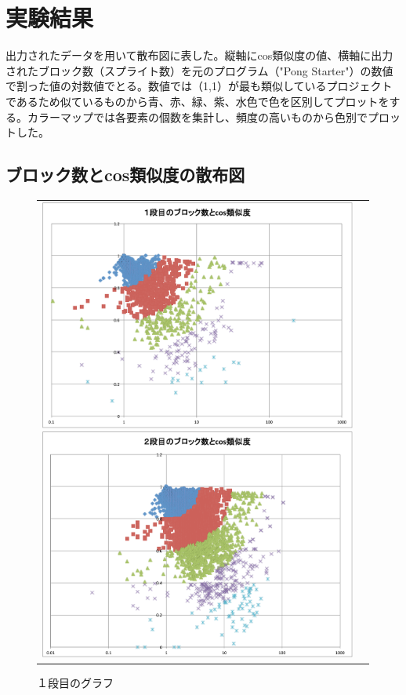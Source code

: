 \documentclass[twocolumn,9pt,a4paper]{jsarticle}
\begin{document}
\section{実験結果}
出力されたデータを用いて散布図に表した。縦軸にcos類似度の値、横軸に出力されたブロック数（スプライト数）を元のプログラム（"Pong Starter"）の数値で割った値の対数値でとる。数値では（1,1）が最も類似しているプロジェクトであるため似ているものから青、赤、緑、紫、水色で色を区別してプロットをする。カラーマップでは各要素の個数を集計し、頻度の高いものから色別でプロットした。
\\
\subsection{ブロック数とcos類似度の散布図}
\begin{figure}[h]
 \begin{tabular}{cc}
 	\begin{minipage}[t]{0.45\hsize}
	 \centering
	 \includegraphics[keepaspectratio, scale = 0.15]{graph_1_block.pdf}
	 \caption{１段目のグラフ}
	 \label{first_block}
	\end{minipage}
        \begin{minipage}[t]{0.45\hsize}
	 \centering
	 \includegraphics[keepaspectratio, scale = 0.15]{graph_2_block.pdf}

\end{minipage}
\end{tabular}
\end{figure}
\end{document}
